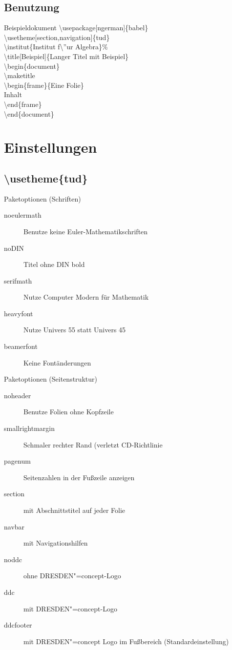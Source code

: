 \documentclass[presentation,t]{beamer}
\begin{document}
\subsection{Benutzung}
\label{sec:org8cda57f}
\begin{frame}[label={sec:orge7a94c5}]{Beispieldokument}
\textbackslash usepackage[ngerman]\{babel\}\\
\textbackslash usetheme[section,navigation]\{tud\}\\
\textbackslash institut\{Institut f\textbackslash ''ur Algebra\}\%\\
\textbackslash title[Beispiel]\{Langer Titel mit Beispiel\}\\
\textbackslash begin\{document\}\\
\textbackslash maketitle\\
\textbackslash begin\{frame\}\{Eine Folie\}\\
Inhalt\\
\textbackslash end\{frame\}\\
\textbackslash end\{document\}\\
\end{frame}

\section{Einstellungen}
\label{sec:org9450a1e}
\subsection{\textbackslash usetheme\{tud\}}
\label{sec:org7543d1e}
\begin{frame}[label={sec:org8492c93}]{Paketoptionen (Schriften)}
\begin{description}
\item[{noeulermath}] Benutze keine Euler-Mathematikschriften
\item[{noDIN}] Titel ohne DIN bold
\item[{serifmath}] Nutze Computer Modern für Mathematik
\item[{heavyfont}] Nutze Univers 55 statt Univers 45
\item[{beamerfont}] Keine Fontänderungen
\end{description}
\end{frame}
\begin{frame}[label={sec:org6fe4286}]{Paketoptionen (Seitenstruktur)}
\begin{description}
\item[{noheader}] Benutze Folien ohne Kopfzeile
\item[{smallrightmargin}] Schmaler rechter Rand (verletzt CD-Richtlinie
\item[{pagenum}] Seitenzahlen in der Fußzeile anzeigen
\item[{section}] mit Abschnittstitel auf jeder Folie
\item[{navbar}] mit Navigationshilfen
\item[{noddc}] ohne DRESDEN"=concept-Logo
\item[{ddc}] mit DRESDEN"=concept-Logo
\item[{ddcfooter}] mit DRESDEN"=concept Logo im Fußbereich (Standardeinstellung)
\end{description}
\end{frame}
\end{document}
